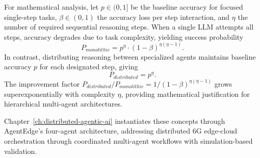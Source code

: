 For mathematical analysis, let $p \in (0,1]$ be the baseline accuracy for focused single-step tasks, $\beta \in (0,1)$ the accuracy loss per step interaction, and $\eta$ the number of required sequential reasoning steps. When a single \ac{LLM} attempts all steps, accuracy degrades due to task complexity, yielding success probability
\begin{equation}
P_{monolithic} = p^\eta \cdot (1-\beta)^{\eta(\eta-1)}.
\label{eq:ch2_monolithic_success}
\end{equation}
In contrast, distributing reasoning between specialized agents maintains baseline accuracy $p$ for each designated step, giving
\begin{equation}
P_{distributed} = p^\eta.
\label{eq:ch2_distributed_success}
\end{equation}
The improvement factor $P_{distributed}/P_{monolithic} = 1/(1-\beta)^{\eta(\eta-1)}$ grows superexponentially with complexity $\eta$, providing mathematical justification for hierarchical multi-agent architectures.

Chapter~\ref{ch:distributed-agentic-ai} instantiates these concepts through \ac{AgentEdge}'s four-agent architecture, addressing distributed \ac{6G} edge-cloud orchestration through coordinated multi-agent workflows with simulation-based validation.
